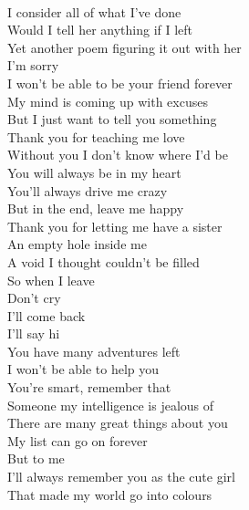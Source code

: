 \documentclass[12pt, b5paper, oneside]{book}
\begin{document}
\\I consider all of what I've done
\\Would I tell her anything if I left
\\Yet another poem figuring it out with her
\\I'm sorry
\\I won't be able to be your friend forever
\\My mind is coming up with excuses
\\But I just want to tell you something
\\Thank you for teaching me love
\\Without you I don't know where I'd be
\\You will always be in my heart
\\You'll always drive me crazy
\\But in the end, leave me happy
\\Thank you for letting me have a sister
\\An empty hole inside me
\\A void I thought couldn't be filled
\\So when I leave
\\Don't cry
\\I'll come back
\\I'll say hi
\\You have many adventures left
\\I won't be able to help you
\\You're smart, remember that
\\Someone my intelligence is jealous of
\\There are many great things about you
\\My list can go on forever
\\But to me
\\I'll always remember you as the cute girl
\\That made my world go into colours 
\newpage
\end{document}
